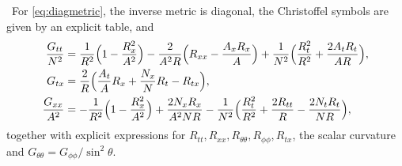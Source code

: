\begin{theorem}\label{thm:einD}\ver\
For \eqref{eq:diagmetric}, the inverse metric is diagonal, the Christoffel symbols are given by an explicit table, and
\begin{align*}
\frac{G_{tt}}{N^2}&=\frac{1}{R^2}\Bigl(1-\frac{R_x^2}{A^2}\Bigr)-\frac{2}{A^2R}\Bigl(R_{xx}-\frac{A_xR_x}{A}\Bigr)+\frac1{N^2}\Bigl(\frac{R_t^2}{R^2}+\frac{2A_tR_t}{AR}\Bigr),\\
G_{tx}&=\frac2R\Bigl(\frac{A_t}{A}R_x+\frac{N_x}{N}R_t-R_{tx}\Bigr),\\
\frac{G_{xx}}{A^2}&=-\frac{1}{R^2}\Bigl(1-\frac{R_x^2}{A^2}\Bigr)+\frac{2N_xR_x}{A^2NR}-\frac1{N^2}\Bigl(\frac{R_t^2}{R^2}+\frac{2R_{tt}}{R}-\frac{2N_tR_t}{NR}\Bigr),
\end{align*}
together with explicit expressions for $R_{tt},R_{xx},R_{\theta\theta},R_{\phi\phi},R_{tx}$, the scalar curvature and $G_{\theta\theta}=G_{\phi\phi}/\sin^2\theta$.
\end{theorem}
